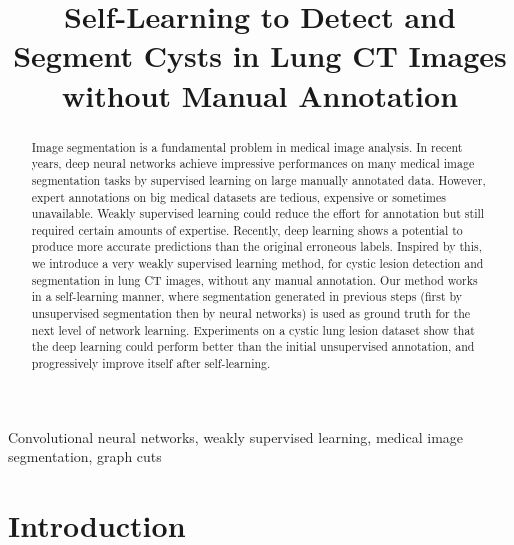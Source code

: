 \documentclass{article}
\title{Self-Learning to Detect and Segment Cysts in Lung CT Images without Manual Annotation}
\begin{document}
\maketitle
\begin{abstract}
Image segmentation is a fundamental problem in medical image analysis. In recent years, deep neural networks achieve impressive performances on many medical image segmentation tasks by supervised learning on large manually annotated data. However, expert annotations on big medical datasets are tedious, expensive or sometimes unavailable. Weakly supervised learning could reduce the effort for annotation but still required certain amounts of expertise. Recently, deep learning shows a potential to produce more accurate predictions than the original erroneous labels. Inspired by this, we introduce a very weakly supervised learning method, for cystic lesion detection and segmentation in lung CT images, without any manual annotation. Our method works in a self-learning manner, where segmentation generated in previous steps (first by unsupervised segmentation then by neural networks) is used as ground truth for the next level of network learning. Experiments on a cystic lung lesion dataset show that the deep learning could perform better than the initial unsupervised annotation, and progressively improve itself after self-learning.
\end{abstract}
\begin{keywords}
Convolutional neural networks, weakly supervised learning, medical image segmentation, graph cuts
\end{keywords}

\section{Introduction}
\label{sec:intro}
\end{document}
